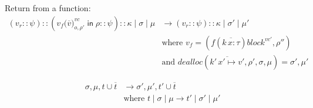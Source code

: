 \documentclass{article}
\newcommand{\LP}{\texttt{(}}
\newcommand{\RP}{\texttt{)}}
\newcommand{\IN}{\mathop{\mathsf{in}}}
\newcommand{\INCTX}[4]{\boxed{#1}^{#2}_{#3} \IN #4}
\begin{document}
\noindent Return from a function:
\begin{align*}
  (v_r :: \psi)
  :: (\INCTX{v_f\LP\overline{v}\RP}{vc}{o,\rho'}{\rho} :: \psi)
  :: \kappa \mid \sigma \mid \mu
  &\longrightarrow
  (v_r :: \psi)  
  :: \kappa \mid \sigma' \mid \mu'\\
  &\text{where } v_f = (f(\overline{k\, x : \tau}) \mathit{block}^{vc'}, \rho'')\\
  &\text{and } \mathit{dealloc}(\overline{k'\,x'\mapsto v'},\rho',\sigma,\mu) = \sigma', \mu'
\end{align*}

\begin{center}
\end{center}

\begin{align*}
  \sigma,\mu, t \cup \overline{t}
   & \longrightarrow
  \sigma',\mu', t' \cup \overline{t} \\
  & \text{where } t \mid \sigma \mid \mu \longrightarrow t' \mid \sigma' \mid \mu'
\end{align*}
\end{document}
